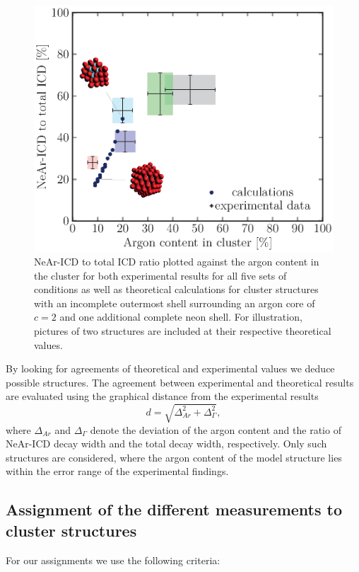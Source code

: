 \begin{figure}[!h]
  \centering
  \includegraphics[scale=0.75]{pics/incompl01_02_mit_inlays.eps}
  \caption{NeAr-ICD to total ICD ratio plotted against the argon content
           in the cluster for both experimental results for all five sets of
           conditions as well as theoretical calculations for cluster structures
           with an incomplete outermost shell surrounding an argon core of
           $c=2$ and one additional complete neon shell. For illustration, pictures
					of two structures are included at their respective theoretical values.}
  \label{figure:incompl01_02_explain}
\end{figure}

By looking for agreements of theoretical and experimental values we deduce
possible structures.
The agreement between experimental and theoretical results are evaluated
using the graphical distance from the experimental results
\begin{equation}
  d = \sqrt{\Delta_{Ar}^2 + \Delta_{\Gamma}^2}    ,
\end{equation}
where $\Delta_{Ar}$ and $\Delta_{\Gamma}$ denote the deviation of the argon content
and the ratio of NeAr-ICD decay width and the total decay width, respectively.
Only such structures are considered, where the argon content of the model
structure lies within the error range of the experimental findings.


\subsection{Assignment of the different measurements to cluster structures}
For our assignments we use the following criteria:

